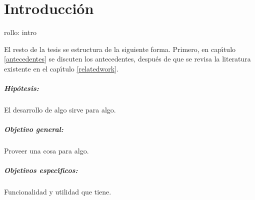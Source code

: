 \chapter{Introducci\'{o}n}

rollo: intro

El resto de la tesis se estructura de la siguiente forma. Primero, en
cap\'{\i}tulo \ref{antecedentes} se discuten los antecedentes,
despu\'{e}s de que se revisa la literatura existente en el
cap\'{\i}tulo \ref{relatedwork}.

\paragraph{Hip\'{o}tesis:} El desarrollo de algo sirve para algo.

\paragraph{Objetivo general:} Proveer una cosa para algo.

\paragraph{Objetivos espec\'{\i}ficos:} Funcionalidad y utilidad que tiene.


